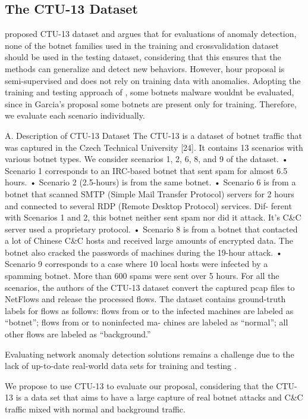 \documentclass[review]{elsarticle}
\begin{document}
\subsection{The CTU-13 Dataset}
\label{sec:CTU-13}


\cite{garcia2014empirical} proposed CTU-13 dataset and argues that for evaluations of anomaly detection, none of the botnet families used in the training and crossvalidation dataset should be used in the testing dataset, considering that this ensures that the methods can generalize and detect new behaviors. However, hour proposal is semi-supervised and does not rely on training data with anomalies. Adopting the training and testing approach of \cite{garcia2014empirical}, some botnets malware wouldnt be evaluated, since in Garcia's proposal some botnets are present only for training. Therefore, we evaluate each scenario individually.


A. Description of CTU-13 Dataset
The CTU-13 is a dataset of botnet traffic that was captured
in the Czech Technical University [24]. It contains 13 scenarios
with various botnet types. We consider scenarios 1, 2, 6, 8, and
9 of the dataset.
• Scenario 1 corresponds to an IRC-based botnet that sent
spam for almost 6.5 hours.
• Scenario 2 (2.5-hours) is from the same botnet.
• Scenario 6 is from a botnet that scanned SMTP (Simple
Mail Transfer Protocol) servers for 2 hours and connected
to several RDP (Remote Desktop Protocol) services. Dif-
ferent with Scenarios 1 and 2, this botnet neither sent
spam nor did it attack. It’s C\&C server used a proprietary
protocol.
• Scenario 8 is from a botnet that contacted a lot of Chinese
C\&C hosts and received large amounts of encrypted data.
The botnet also cracked the passwords of machines during
the 19-hour attack.
• Scenario 9 corresponds to a case where 10 local hosts
were infected by a spamming botnet. More than 600 spams
were sent over 5 hours.
For all the scenarios, the authors of the CTU-13 dataset
convert the captured pcap files to NetFlows and release the
processed flows. The dataset contains ground-truth labels for
flows as follows: flows from or to the infected machines
are labeled as “botnet”; flows from or to noninfected ma-
chines are labeled as “normal”; all other flows are labeled as
“background.”

Evaluating network anomaly detection solutions remains a challenge due to the lack of up-to-date real-world data sets for training and testing \cite{osanaiye2016distributed}. 

We propose to use CTU-13 \cite{garcia2014empirical} to evaluate our proposal, considering that the CTU-13 is a data set that aims to have a large capture of real botnet attacks and C\&C traffic mixed with normal and background traffic.
\end{document}

